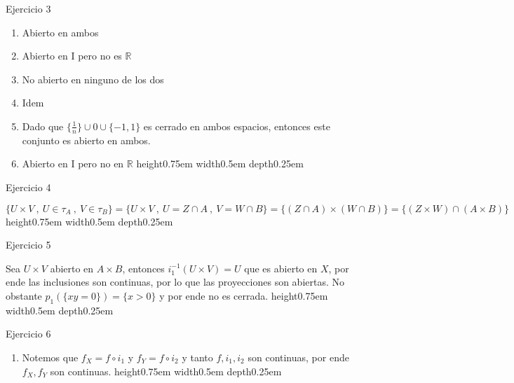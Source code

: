 \documentclass[11pt]{article}
\newcommand{\R}{{\mathbb{R}}}
\newcommand{\sett}[1]{\{#1\}}
\newcommand{\sette}[2]{\{#1 \ , \ #2 \}}
\newenvironment{proof}[1][Demostraci\'on]{\begin{trivlist}
\item[\hskip \labelsep {\bfseries #1}]}{\end{trivlist}}
\newcommand{\qed}{\nobreak \ifvmode \relax \else
      \ifdim\lastskip<1.5em \hskip-\lastskip
      \hskip1.5em plus0em minus0.5em \fi \nobreak
      \vrule height0.75em width0.5em depth0.25em\fi}
\begin{document}
\begin{enumerate}
\begin{proof}
\begin{enumerate}
\begin{itemize}
\end{itemize}

\end{enumerate}
\end{proof}

\item {Ejercicio 3}

\begin{proof}

\begin{enumerate}
\item Abierto en ambos
\item Abierto en I pero no es $\R$
\item No abierto en ninguno de los dos
\item Idem
\item Dado que $\sett{\frac{1}{n}} \cup 0 \cup \sett{-1,1}$ es cerrado en ambos espacios, entonces este conjunto es abierto en ambos.
\item Abierto en I pero no en $\R$ \qed
\end{enumerate}

\end{proof}

\item {Ejercicio 4}

\begin{proof}

$\sette{U \times V}{U \in \tau_A \ , \ V \in \tau_B} = \sette{U \times V}{U = Z \cap A \ , \ V = W \cap B} = \sett{(Z \cap A) \times (W \cap B)} = \sett{(Z \times W) \cap (A \times B)}$ \qed

\end{proof}

\item {Ejercicio 5}

\begin{proof}

Sea $U \times V$ abierto en $A \times B$, entonces $i_1^{-1}(U \times V) = U$ que es abierto en $X$, por ende las inclusiones son continuas, por lo que las proyecciones son abiertas. No obstante $p_1 (\sett{xy=0}) = \sett{x > 0}$ y por ende no es cerrada. \qed

\end{proof}

\item {Ejercicio 6}

\begin{proof}
\begin{enumerate}

\item Notemos que $f_X = f \circ i_1$ y $f_Y = f \circ i_2$ y tanto $f,i_1,i_2$ son continuas, por ende $f_X,f_Y$ son continuas. \qed 


\end{enumerate}
\end{proof}
\end{enumerate}
\end{document}
